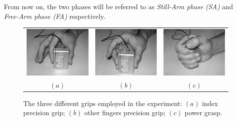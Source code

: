 From now on,
the two phases will be referred to as \emph{Still-Arm phase (SA)} and \emph{Free-Arm phase (FA)} respectively.

\begin{figure}[!t] \centering
  \begin{tabular}{ccc}
   \includegraphics[height=0.16\textheight]{figs/grip1} &
    \includegraphics[height=0.16\textheight]{figs/grip2} &
    \includegraphics[height=0.16\textheight]{figs/grip3} \\
    $(a)$ & $(b)$ & $(c)$ \\
  \end{tabular}
  \caption{The three different grips employed in the experiment: $(a)$
   index precision grip; $(b)$ other fingers precision grip; $(c)$
   power grasp.}
  \label{fig:Grasps}
\end{figure}

